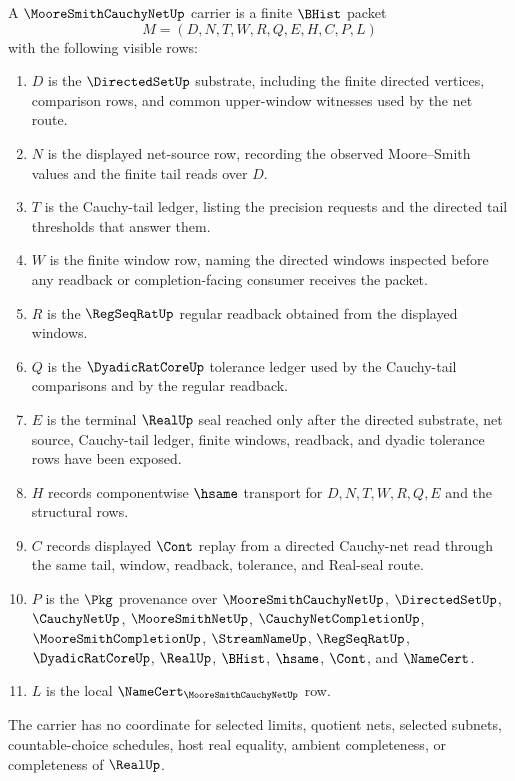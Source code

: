 \begin{definition}
\label{def:moore-smith-cauchy-net-carrier}
A $\MooreSmithCauchyNetUp$ carrier is a finite $\BHist$ packet
$$
M=(D,N,T,W,R,Q,E,H,C,P,L)
$$
with the following visible rows:
\begin{enumerate}
\item $D$ is the $\DirectedSetUp$ substrate, including the finite directed vertices, comparison rows, and common upper-window witnesses used by the net route.
\item $N$ is the displayed net-source row, recording the observed Moore--Smith values and the finite tail reads over $D$.
\item $T$ is the Cauchy-tail ledger, listing the precision requests and the directed tail thresholds that answer them.
\item $W$ is the finite window row, naming the directed windows inspected before any readback or completion-facing consumer receives the packet.
\item $R$ is the $\RegSeqRatUp$ regular readback obtained from the displayed windows.
\item $Q$ is the $\DyadicRatCoreUp$ tolerance ledger used by the Cauchy-tail comparisons and by the regular readback.
\item $E$ is the terminal $\RealUp$ seal reached only after the directed substrate, net source, Cauchy-tail ledger, finite windows, readback, and dyadic tolerance rows have been exposed.
\item $H$ records componentwise $\hsame$ transport for $D,N,T,W,R,Q,E$ and the structural rows.
\item $C$ records displayed $\Cont$ replay from a directed Cauchy-net read through the same tail, window, readback, tolerance, and Real-seal route.
\item $P$ is the $\Pkg$ provenance over $\MooreSmithCauchyNetUp$, $\DirectedSetUp$, $\CauchyNetUp$, $\MooreSmithNetUp$, $\CauchyNetCompletionUp$, $\MooreSmithCompletionUp$, $\StreamNameUp$, $\RegSeqRatUp$, $\DyadicRatCoreUp$, $\RealUp$, $\BHist$, $\hsame$, $\Cont$, and $\NameCert$.
\item $L$ is the local $\NameCert_{\MooreSmithCauchyNetUp}$ row.
\end{enumerate}
The carrier has no coordinate for selected limits, quotient nets, selected subnets, countable-choice schedules, host real equality, ambient completeness, or completeness of $\RealUp$.
\end{definition}

